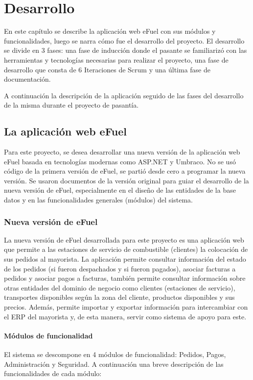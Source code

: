 \chapter{Desarrollo} \label{development}
En este capítulo se describe la aplicación web eFuel con sus módulos y funcionalidades, luego se narra cómo fue el desarrollo del proyecto. El desarrollo se divide en 3 fases: una fase de inducción donde el pasante se familiarizó con las herramientas y tecnologías necesarias para realizar el proyecto, una fase de desarrollo que consta de 6 Iteraciones de Scrum y una última fase de documentación.

A continuación la descripción de la aplicación seguido de las fases del desarrollo de la misma durante el proyecto de pasantía.

\section{La aplicación web eFuel}
Para este proyecto, se desea desarrollar una nueva versión de la aplicación web eFuel basada en tecnologías modernas como ASP.NET y Umbraco. No se usó código de la primera versión de eFuel, se partió desde cero a programar la nueva versión. Se usaron documentos de la versión original para guiar el desarrollo de la nueva versión de eFuel, especialmente en el diseño de las entidades de la base datos y en las funcionalidades generales (módulos) del sistema.

\subsection{Nueva versión de eFuel}
La nueva versión de eFuel desarrollada para este proyecto es una aplicación web que permite a las estaciones de servicio de combustible (clientes) la colocación de sus pedidos al mayorista. La aplicación permite consultar información del estado de los pedidos (si fueron despachados y si fueron pagados), asociar facturas a pedidos y asociar pagos a facturas, también permite consultar información sobre otras entidades del dominio de negocio como clientes (estaciones de servicio), transportes disponibles según la zona del cliente, productos disponibles y sus precios. Además, permite importar y exportar información para intercambiar con el \ac{ERP} del mayorista y, de esta manera, servir como sistema de apoyo para este.

\subsubsection{Módulos de funcionalidad}
El sistema se descompone en 4 módulos de funcionalidad: Pedidos, Pagos, Administración y Seguridad. A continuación una breve descripción de las funcionalidades de cada módulo:

